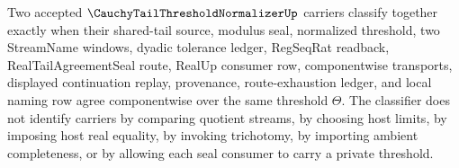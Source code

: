 \begin{definition}
\label{def:cauchy-tail-threshold-normalizer-classifier}
Two accepted $\CauchyTailThresholdNormalizerUp$ carriers classify together exactly when their shared-tail source, modulus seal, normalized threshold, two StreamName windows, dyadic tolerance ledger, RegSeqRat readback, RealTailAgreementSeal route, RealUp consumer row, componentwise transports, displayed continuation replay, provenance, route-exhaustion ledger, and local naming row agree componentwise over the same threshold $\Theta$. The classifier does not identify carriers by comparing quotient streams, by choosing host limits, by imposing host real equality, by invoking trichotomy, by importing ambient completeness, or by allowing each seal consumer to carry a private threshold.
\end{definition}

